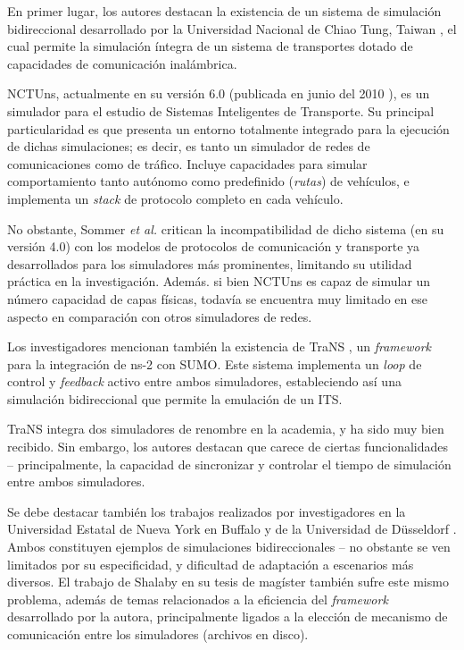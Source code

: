 En primer lugar, los autores destacan la existencia de un sistema de simulación bidireccional desarrollado por la Universidad Nacional de Chiao Tung, Taiwan \autocite{nctuns4,nctuns6}, el cual permite la simulación íntegra de un sistema de transportes dotado de capacidades de comunicación inalámbrica. 

NCTUns, actualmente en su versión 6.0 (publicada en junio del 2010 \autocite{nctuns6}), es un simulador para el estudio de Sistemas Inteligentes de Transporte. Su principal particularidad es que presenta un entorno totalmente integrado para la ejecución de dichas simulaciones; es decir, es tanto un simulador de redes de comunicaciones como de tráfico. Incluye capacidades para simular comportamiento tanto autónomo como predefinido (\emph{rutas}) de vehículos, e implementa un \emph{stack} de protocolo completo en cada vehículo.

No obstante, Sommer \emph{et al.} critican la incompatibilidad de dicho sistema (en su versión 4.0) con los modelos de protocolos de comunicación y transporte ya desarrollados para los simuladores más prominentes, limitando su utilidad práctica en la investigación. Además. si bien NCTUns es capaz de simular un número capacidad de capas físicas, todavía se encuentra muy limitado en ese aspecto en comparación con otros simuladores de redes.

Los investigadores mencionan también la existencia de TraNS \autocite{piorkowski2008trans}, un \emph{framework} para la integración de ns-2 con SUMO. Este sistema implementa un \emph{loop} de control y \emph{feedback} activo entre ambos simuladores, estableciendo así una simulación bidireccional que permite la emulación de un ITS.

TraNS integra dos simuladores de renombre en la academia, y ha sido muy bien recibido. Sin embargo, los autores destacan que carece de ciertas funcionalidades -- principalmente, la capacidad de sincronizar y controlar el tiempo de simulación entre ambos simuladores.

Se debe destacar también los trabajos realizados por investigadores en la Universidad Estatal de Nueva York en Buffalo \autocite{zhao2016integrated} y de la Universidad de Düsseldorf \autocite{lochert2005multiple}. Ambos constituyen ejemplos de simulaciones bidireccionales -- no obstante se ven limitados por su especificidad, y dificultad de adaptación a escenarios más diversos. El trabajo de Shalaby en su tesis de magíster \autocite{shalaby} también sufre este mismo problema, además de temas relacionados a la eficiencia del \emph{framework} desarrollado por la autora, principalmente ligados a la elección de mecanismo de comunicación entre los simuladores (archivos en disco).


